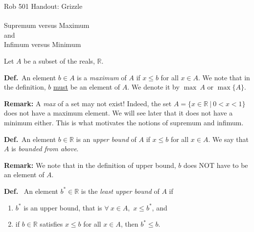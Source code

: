 \documentclass[letterpaper]{article}
\newcommand{\real}{\mathbb R}  %
\begin{document}

\baselineskip=18pt  %

\setlength{\parskip}{.3in}
\setlength{\itemsep}{.3in}

\pagestyle{plain}

{\Large \bf
\begin{center}
Rob 501 Handout: Grizzle \\
\mbox{} \\
Supremum versus Maximum \\
and \\
Infimum versus Minimum
\end{center}
}



\Large

Let $A$ be a subset of the reals, $\real$.

\noindent \textbf{Def.}~An element $b\in A$ is a \textit{maximum} of $A$ if $x \le b$ for all  $x\in A$.
We note that in the definition,  $b$ \underline{must} be an element of $A$. We denote it by $\max~A$ or $\max \{ A\}$.

\noindent \textbf{Remark:} A \textit{max} of a set may not exist! Indeed, the set $A = \{  x\in \real~|~ 0  < x < 1\}$ does not have a maximum element. We will see later that it does not have a minimum either. This is what motivates the notions of supremum and infimum.

\noindent \textbf{Def.}~An element $b\in \real$ is an \textit{upper bound} of $A$ if $x \le b$ for all  $x\in A$.  We say that $A$  is \textit{bounded from above}.

\noindent \textbf{Remark:} We note that in the definition of upper bound,  $b$ does NOT have to be an element of $A$.

\noindent \textbf{Def.}~ An element $b^*\in \real$ is the \textit{least upper bound} of $A$ if
\vspace*{-.2in}
\begin{enumerate}
\item $b^*$ is an upper bound, that is $\forall ~x\in A$,~$x \le b^*$, and
\item  if $b\in \real$ satisfies $ x \le b$ for all $x\in A$, then $b^* \le b$.
\end{enumerate}
\end{document}
